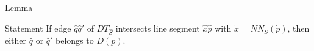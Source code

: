 \documentclass{beamer}
\begin{document}
\begin{frame}{Lemma}
\begin{block}{Statement}
If edge $\hat{q}{\hat{q}\prime}$ of $DT_{\hat{S}}$ intersects line segment $\hat{x}\hat{p}$ with $\dot{x} = NN_{\dot{S}}(\dot{p})$, then either $\hat{q}$ or ${\hat{q}\prime}$ belongs to $D(p)$.
\end{block}
\begin{figure}
\centering
{}

\end{figure}
\end{frame}
\end{document}
